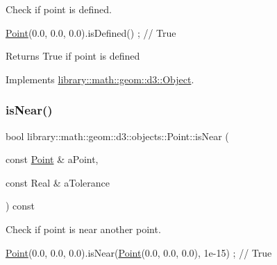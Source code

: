 Check if point is defined. 


\begin{DoxyCode}
\hyperlink{classlibrary_1_1math_1_1geom_1_1d3_1_1objects_1_1_point_a617e690ab6091af3de729cee337e309e}{Point}(0.0, 0.0, 0.0).isDefined() ; \textcolor{comment}{// True}
\end{DoxyCode}


\begin{DoxyReturn}{Returns}
True if point is defined 
\end{DoxyReturn}


Implements \hyperlink{classlibrary_1_1math_1_1geom_1_1d3_1_1_object_a2216442e322f0c3ca5f01a4efa22baf7}{library\+::math\+::geom\+::d3\+::\+Object}.

\mbox{\label{classlibrary_1_1math_1_1geom_1_1d3_1_1objects_1_1_point_a0bcdce172502509f9b9d4e5b3fc75a69}} 
\subsubsection{\texorpdfstring{is\+Near()}{isNear()}}
{\footnotesize\ttfamily bool library\+::math\+::geom\+::d3\+::objects\+::\+Point\+::is\+Near (\begin{DoxyParamCaption}\item[{const \hyperlink{classlibrary_1_1math_1_1geom_1_1d3_1_1objects_1_1_point}{Point} \&}]{a\+Point,  }\item[{const Real \&}]{a\+Tolerance }\end{DoxyParamCaption}) const}



Check if point is near another point. 


\begin{DoxyCode}
\hyperlink{classlibrary_1_1math_1_1geom_1_1d3_1_1objects_1_1_point_a617e690ab6091af3de729cee337e309e}{Point}(0.0, 0.0, 0.0).isNear(\hyperlink{classlibrary_1_1math_1_1geom_1_1d3_1_1objects_1_1_point_a617e690ab6091af3de729cee337e309e}{Point}(0.0, 0.0, 0.0), 1e-15) ; \textcolor{comment}{// True}
\end{DoxyCode}



